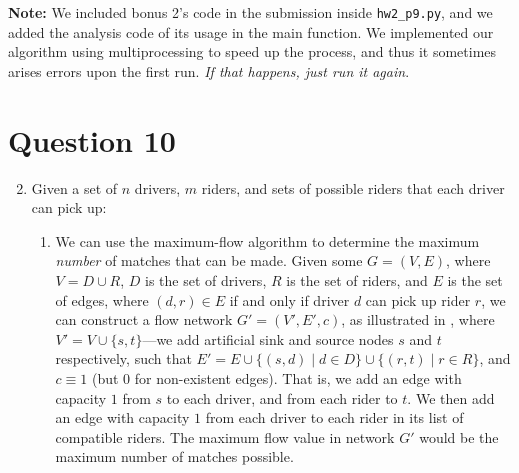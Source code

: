 \documentclass{article}
\begin{document}
\textbf{Note:} We included bonus 2's code in the submission inside \texttt{hw2\_p9.py}, and we added the analysis code of its usage in the main function. We implemented our algorithm using multiprocessing to speed up the process, and thus it sometimes arises errors upon the first run. \textit{If that happens, just run it again}.

\FloatBarrier

\section{Question 10}

\begin{enumerate}[label=(\alph*)]
    \setcounter{enumi}{1}

    \item Given a set of $n$ drivers, $m$ riders, and sets of possible riders that each driver can pick up:
    
    \begin{enumerate}[label=(\roman*)]
        \item We can use the maximum-flow algorithm to determine the maximum \textit{number} of matches that can be made. Given some $G = (V, E)$, where $V = D \cup R$, $D$ is the set of drivers, $R$ is the set of riders, and $E$ is the set of edges, where $(d, r) \in E$ if and only if driver $d$ can pick up rider $r$, we can construct a flow network $G' = (V', E', c)$, as illustrated in , where $V' = V \cup \{s, t\}$---we add artificial sink and source nodes $s$ and $t$ respectively, such that $E' = E \cup \{(s, d) \mid d \in D\} \cup \{(r, t) \mid r \in R\}$, and $c \equiv 1$ (but 0 for non-existent edges). That is, we add an edge with capacity $1$ from $s$ to each driver, and from each rider to $t$. We then add an edge with capacity $1$ from each driver to each rider in its list of compatible riders. The maximum flow value in network $G'$ would be the maximum number of matches possible.
        
        \begin{figure*}[h]
            \centering
\end{figure*}
\end{enumerate}
\end{enumerate}
\end{document}
